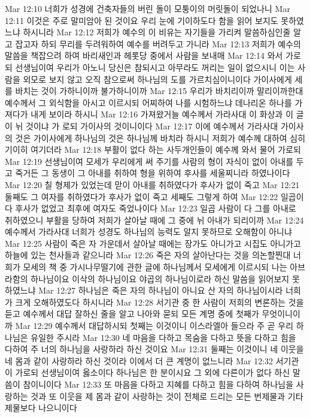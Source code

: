 Mar 12:10  너희가 성경에 건축자들의 버린 돌이 모퉁이의 머릿돌이 되었나니
Mar 12:11  이것은 주로 말미암아 된 것이요 우리 눈에 기이하도다 함을 읽어 보지도 못하였느냐 하시니라
Mar 12:12  저희가 예수의 이 비유는 자기들을 가리켜 말씀하심인줄 알고 잡고자 하되 무리를 두려워하여 예수를 버려두고 가니라
Mar 12:13  저희가 예수의 말씀을 책잡으려 하여 바리새인과 헤롯당 중에서 사람을 보내매
Mar 12:14  와서 가로되 선생님이여 우리가 아노니 당신은 참되시고 아무라도 꺼리는 일이 없으시니 이는 사람을 외모로 보지 않고 오직 참으로써 하나님의 도를 가르치심이니이다 가이사에게 세를 바치는 것이 가하니이까 불가하니이까
Mar 12:15  우리가 바치리이까 말리이까한대 예수께서 그 외식함을 아시고 이르시되 어찌하여 나를 시험하느냐 데나리온 하나를 가져다가 내게 보이라 하시니
Mar 12:16  가져왔거늘 예수께서 가라사대 이 화상과 이 글이 뉘 것이냐 가 로되 가이사의 것이니이다
Mar 12:17  이에 예수께서 가라사대 가이사의 것은 가이사에게 하나님의 것은 하나님께 바치라 하시니 저희가 예수께 대하여 심히 기이히 여기더라
Mar 12:18  부활이 없다 하는 사두개인들이 예수께 와서 물어 가로되
Mar 12:19  선생님이여 모세가 우리에게 써 주기를 사람의 형이 자식이 없이 아내를 두고 죽거든 그 동생이 그 아내를 취하여 형을 위하여 후사를 세울찌니라 하였나이다
Mar 12:20  칠 형제가 있었는데 맏이 아내를 취하였다가 후사가 없이 죽고
Mar 12:21  둘째도 그 여자를 취하였다가 후사가 없이 죽고 세째도 그렇게 하여
Mar 12:22  일곱이 다 후사가 없었고 최후에 여자도 죽었나이다
Mar 12:23  일곱 사람이 다 그를 아내로 취하였으니 부활을 당하여 저희가 살아날 때에 그 중에 뉘 아내가 되리이까
Mar 12:24  예수께서 가라사대 너희가 성경도 하나님의 능력도 알지 못하므로 오해함이 아니냐
Mar 12:25  사람이 죽은 자 가운데서 살아날 때에는 장가도 아니가고 시집도 아니가고 하늘에 있는 천사들과 같으니라
Mar 12:26  죽은 자의 살아난다는 것을 의논할찐대 너희가 모세의 책 중 가시나무떨기에 관한 글에 하나님께서 모세에게 이르시되 나는 아브라함의 하나님이요 이삭의 하나님이요 야곱의 하나님이로라 하신 말씀을 읽어보지 못하였느냐
Mar 12:27  하나님은 죽은 자의 하나님이 아니요 산 자의 하나님이시라 너희가 크게 오해하였도다 하시니라
Mar 12:28  서기관 중 한 사람이 저희의 변론하는 것을 듣고 예수께서 대답 잘하신 줄을 알고 나아와 묻되 모든 계명 중에 첫째가 무엇이니이까
Mar 12:29  예수께서 대답하시되 첫째는 이것이니 이스라엘아 들으라 주 곧 우리 하나님은 유일한 주시라
Mar 12:30  네 마음을 다하고 목숨을 다하고 뜻을 다하고 힘을 다하여 주 너의 하나님을 사랑하라 하신 것이요
Mar 12:31  둘째는 이것이니 네 이웃을 네 몸과 같이 사랑하라 하신 것이라 이에서 더 큰 계명이 없느니라
Mar 12:32  서기관이 가로되 선생님이여 옳소이다 하나님은 한 분이시요 그 외에 다른이가 없다 하신 말씀이 참이니이다
Mar 12:33  또 마음을 다하고 지혜를 다하고 힘을 다하여 하나님을 사랑하는 것과 또 이웃을 제 몸과 같이 사랑하는 것이 전체로 드리는 모든 번제물과 기타 제물보다 나으니이다
